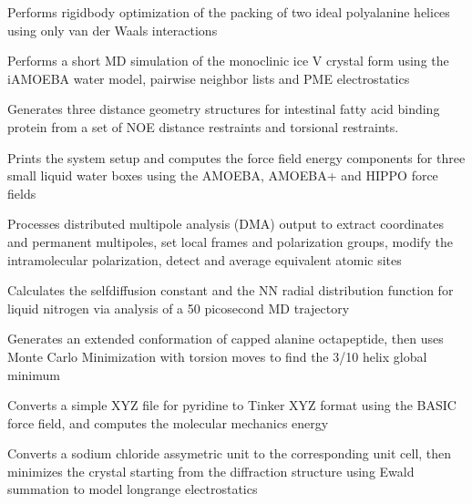 \documentclass[letterpaper,11pt,english]{sphinxmanual}
\begin{document}
\sphinxAtStartPar
{}

\sphinxAtStartPar
Performs rigid\sphinxhyphen{}body optimization of the packing of two ideal polyalanine helices using only van der Waals interactions

\sphinxAtStartPar
{}

\sphinxAtStartPar
Performs a short MD simulation of the monoclinic ice V crystal form using the iAMOEBA water model, pairwise neighbor lists and PME electrostatics

\sphinxAtStartPar
{}

\sphinxAtStartPar
Generates three distance geometry structures for intestinal fatty acid binding protein from a set of NOE distance restraints and torsional restraints.

\sphinxAtStartPar
{}

\sphinxAtStartPar
Prints the system setup and computes the force field energy components for three small liquid water boxes using the AMOEBA, AMOEBA+ and HIPPO force fields

\sphinxAtStartPar
{}

\sphinxAtStartPar
Processes distributed multipole analysis (DMA) output to extract coordinates and permanent multipoles, set local frames and polarization groups, modify the intramolecular polarization, detect and average equivalent atomic sites

\sphinxAtStartPar
{}

\sphinxAtStartPar
Calculates the self\sphinxhyphen{}diffusion constant and the N\sphinxhyphen{}N radial distribution function for liquid nitrogen via analysis of a 50 picosecond MD trajectory

\sphinxAtStartPar
{}

\sphinxAtStartPar
Generates an extended conformation of capped alanine octapeptide, then uses Monte Carlo Minimization with torsion moves to find the 3/10 helix global minimum

\sphinxAtStartPar
{}

\sphinxAtStartPar
Converts a simple XYZ file for pyridine to Tinker XYZ format using the BASIC force field, and computes the molecular mechanics energy

\sphinxAtStartPar
{}

\sphinxAtStartPar
Converts a sodium chloride assymetric unit to the corresponding unit cell, then minimizes the crystal starting from the diffraction structure using Ewald summation to model long\sphinxhyphen{}range electrostatics
\end{document}
